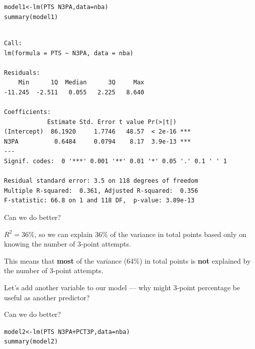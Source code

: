 \documentclass{beamer}\usepackage[]{graphicx}\usepackage[]{color}
\makeatletter
\newcommand{\hlopt}[1]{\textcolor[rgb]{1,0.894,0.769}{#1}}%
\newcommand{\hlstd}[1]{\textcolor[rgb]{1,0.894,0.769}{#1}}%
\newcommand{\hlkwb}[1]{\textcolor[rgb]{0.804,0.776,0.451}{#1}}%
\newcommand{\hlkwc}[1]{\textcolor[rgb]{0.78,0.941,0.545}{#1}}%
\newcommand{\hlkwd}[1]{\textcolor[rgb]{1,0.78,0.769}{#1}}%
\newenvironment{kframe}{%
 \def\at@end@of@kframe{}%
 \ifinner\ifhmode%
  \def\at@end@of@kframe{\end{minipage}}%
  \begin{minipage}{\columnwidth}%
 \fi\fi%
 \def\FrameCommand##1{\hskip\@totalleftmargin \hskip-\fboxsep
 \colorbox{shadecolor}{##1}\hskip-\fboxsep
     \hskip-\linewidth \hskip-\@totalleftmargin \hskip\columnwidth}%
 \MakeFramed {\advance\hsize-\width
   \@totalleftmargin\z@ \linewidth\hsize
   \@setminipage}}%
 {\par\unskip\endMakeFramed%
 \at@end@of@kframe}
\newenvironment{knitrout}{}{} %
\makeatother
\begin{document}
\begin{darkframes}
\begin{frame}[fragile]
\begin{knitrout}
\end{knitrout}
      \lc
\end{frame}

\begin{frame}[fragile]
      \fontsize{8}{8}\selectfont
\begin{knitrout}
\begin{kframe}
\begin{alltt}
\hlstd{model1} \hlkwb{<-} \hlkwd{lm}\hlstd{(PTS} \hlopt{~} \hlstd{N3PA,} \hlkwc{data}\hlstd{=nba)}
\hlkwd{summary}\hlstd{(model1)}
\end{alltt}
\begin{verbatim}

Call:
lm(formula = PTS ~ N3PA, data = nba)

Residuals:
    Min      1Q  Median      3Q     Max 
-11.245  -2.511   0.055   2.225   8.640 

Coefficients:
            Estimate Std. Error t value Pr(>|t|)    
(Intercept)  86.1920     1.7746   48.57  < 2e-16 ***
N3PA          0.6484     0.0794    8.17  3.9e-13 ***
---
Signif. codes:  0 '***' 0.001 '**' 0.01 '*' 0.05 '.' 0.1 ' ' 1

Residual standard error: 3.5 on 118 degrees of freedom
Multiple R-squared:  0.361,	Adjusted R-squared:  0.356 
F-statistic: 66.8 on 1 and 118 DF,  p-value: 3.89e-13
\end{verbatim}
\end{kframe}
\end{knitrout}
      \lc
\end{frame}

    \begin{frame}{Can we do better?}
      \begin{center}
        $R^2=36\%$, so we can explain
        36\% of the variance in total points based only on
        knowing the number of 3-point attempts.

        \pause\bigskip

        This means that \textbf{most} of the variance (64\%) in total points is \textbf{not} explained by the number of 3-point attempts.

        \pause\bigskip

        Let's add another variable to our model --- why might 3-point percentage be useful as another predictor?
      \end{center}
      \lc
    \end{frame}
    
\begin{frame}[fragile]{Can we do better?}
      \fontsize{8}{8}\selectfont
\begin{knitrout}
\begin{kframe}
\begin{alltt}
\hlstd{model2} \hlkwb{<-} \hlkwd{lm}\hlstd{(PTS} \hlopt{~} \hlstd{N3PA} \hlopt{+} \hlstd{PCT3P,} \hlkwc{data}\hlstd{=nba)}
\hlkwd{summary}\hlstd{(model2)}
\end{alltt}
\begin{verbatim}


\end{verbatim}
\end{kframe}
\end{knitrout}
\end{frame}
\end{darkframes}
\end{document}
